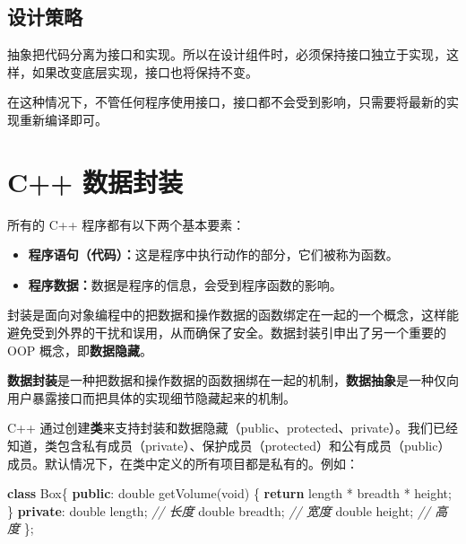 \documentclass[
]{article}
\newenvironment{Shaded}{}{}
\newcommand{\CommentTok}[1]{\textcolor[rgb]{0.38,0.63,0.69}{\textit{#1}}}
\newcommand{\ControlFlowTok}[1]{\textcolor[rgb]{0.00,0.44,0.13}{\textbf{#1}}}
\newcommand{\DataTypeTok}[1]{\textcolor[rgb]{0.56,0.13,0.00}{#1}}
\newcommand{\KeywordTok}[1]{\textcolor[rgb]{0.00,0.44,0.13}{\textbf{#1}}}
\newcommand{\NormalTok}[1]{#1}
\newcommand{\OperatorTok}[1]{\textcolor[rgb]{0.40,0.40,0.40}{#1}}
\providecommand{\tightlist}{%
  \setlength{\itemsep}{0pt}\setlength{\parskip}{0pt}}
\begin{document}
\hypertarget{ux8bbeux8ba1ux7b56ux7565}{%
\subsection{设计策略}\label{ux8bbeux8ba1ux7b56ux7565}}

抽象把代码分离为接口和实现。所以在设计组件时，必须保持接口独立于实现，这样，如果改变底层实现，接口也将保持不变。

在这种情况下，不管任何程序使用接口，接口都不会受到影响，只需要将最新的实现重新编译即可。

\hypertarget{c-ux6570ux636eux5c01ux88c5}{%
\section{C++ 数据封装}\label{c-ux6570ux636eux5c01ux88c5}}

所有的 C++ 程序都有以下两个基本要素：

\begin{itemize}
\tightlist
\item
  \textbf{程序语句（代码）：}这是程序中执行动作的部分，它们被称为函数。
\item
  \textbf{程序数据：}数据是程序的信息，会受到程序函数的影响。
\end{itemize}

封装是面向对象编程中的把数据和操作数据的函数绑定在一起的一个概念，这样能避免受到外界的干扰和误用，从而确保了安全。数据封装引申出了另一个重要的
OOP 概念，即\textbf{数据隐藏}。

\textbf{数据封装}是一种把数据和操作数据的函数捆绑在一起的机制，\textbf{数据抽象}是一种仅向用户暴露接口而把具体的实现细节隐藏起来的机制。

C++
通过创建\textbf{类}来支持封装和数据隐藏（public、protected、private）。我们已经知道，类包含私有成员（private）、保护成员（protected）和公有成员（public）成员。默认情况下，在类中定义的所有项目都是私有的。例如：

\begin{Shaded}
\begin{Highlighting}[]
\KeywordTok{class}\NormalTok{ Box}\OperatorTok{\{}
   \KeywordTok{public}\OperatorTok{:}
      \DataTypeTok{double}\NormalTok{ getVolume}\OperatorTok{(}\DataTypeTok{void}\OperatorTok{)}
      \OperatorTok{\{}
         \ControlFlowTok{return}\NormalTok{ length }\OperatorTok{*}\NormalTok{ breadth }\OperatorTok{*}\NormalTok{ height}\OperatorTok{;}
      \OperatorTok{\}}
   \KeywordTok{private}\OperatorTok{:}
      \DataTypeTok{double}\NormalTok{ length}\OperatorTok{;}      \CommentTok{// 长度}
      \DataTypeTok{double}\NormalTok{ breadth}\OperatorTok{;}     \CommentTok{// 宽度}
      \DataTypeTok{double}\NormalTok{ height}\OperatorTok{;}      \CommentTok{// 高度}
\OperatorTok{\};}
\end{Highlighting}
\end{Shaded}
\end{document}
